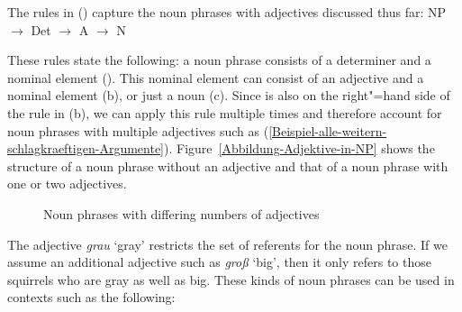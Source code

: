 %
The rules in () capture the noun phrases with adjectives discussed thus far:
\eal
\label{NP-Regeln}
\ex NP $\to$ Det \nbar
\ex\label{NP-Regeln-Adj} \nbar $\to$ A \nbar
\ex\label{NP-Regeln-Nbar-N} \nbar $\to$ N
\zl

\largerpage
\noindent
These rules state the following: a noun phrase consists of a determiner and a nominal element (\nbar). This nominal element
can consist of an adjective and a nominal element (b), or just a noun (c). Since \nbar is also on the right"=hand side
of the rule in (b), we can apply this rule multiple times and therefore account for noun phrases with multiple adjectives such as
(\ref{Beispiel-alle-weitern-schlagkraeftigen-Argumente}). Figure~\vref{Abbildung-Adjektive-in-NP} shows the structure of a noun phrase
without an adjective and that of a noun phrase with one or two adjectives.
\begin{figure}
\hfill
{}
%
\hfill
{}
%
\caption{\label{Abbildung-Adjektive-in-NP}Noun phrases with differing numbers of adjectives}
\end{figure}%
The adjective \emph{grau} `gray' restricts the set of referents for the noun phrase. If we assume an
additional adjective such as \emph{groß} `big', then it only refers to those squirrels who are gray
as well as big. These kinds of noun phrases can be used in contexts such as the following:

